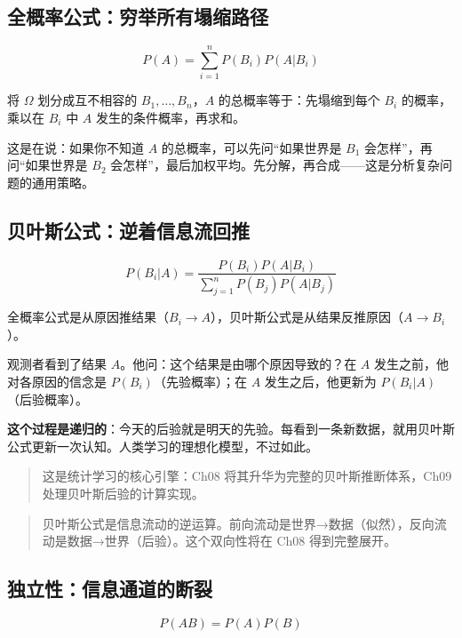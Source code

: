\documentclass[
]{book}
\begin{document}
\subsection{全概率公式：穷举所有塌缩路径}\label{ux5168ux6982ux7387ux516cux5f0fux7a77ux4e3eux6240ux6709ux584cux7f29ux8defux5f84}

\[P(A) = \sum_{i=1}^n P(B_i) P(A|B_i)\]

将 \(\Omega\) 划分成互不相容的 \(B_1, \ldots, B_n\)，\(A\) 的总概率等于：先塌缩到每个 \(B_i\) 的概率，乘以在 \(B_i\) 中 \(A\) 发生的条件概率，再求和。

这是在说：如果你不知道 \(A\) 的总概率，可以先问``如果世界是 \(B_1\) 会怎样''，再问``如果世界是 \(B_2\) 会怎样''，最后加权平均。先分解，再合成------这是分析复杂问题的通用策略。

\subsection{贝叶斯公式：逆着信息流回推}\label{ux8d1dux53f6ux65afux516cux5f0fux9006ux7740ux4fe1ux606fux6d41ux56deux63a8}

\[P(B_i|A) = \frac{P(B_i) P(A|B_i)}{\sum_{j=1}^n P(B_j) P(A|B_j)}\]

全概率公式是从原因推结果（\(B_i \to A\)），贝叶斯公式是从结果反推原因（\(A \to B_i\)）。

观测者看到了结果 \(A\)。他问：这个结果是由哪个原因导致的？在 \(A\) 发生之前，他对各原因的信念是 \(P(B_i)\)（先验概率）；在 \(A\) 发生之后，他更新为 \(P(B_i|A)\)（后验概率）。

\textbf{这个过程是递归的}：今天的后验就是明天的先验。每看到一条新数据，就用贝叶斯公式更新一次认知。人类学习的理想化模型，不过如此。

\begin{quote}
这是统计学习的核心引擎：Ch08 将其升华为完整的贝叶斯推断体系，Ch09 处理贝叶斯后验的计算实现。
\end{quote}

\begin{quote}
贝叶斯公式是信息流动的逆运算。前向流动是世界→数据（似然），反向流动是数据→世界（后验）。这个双向性将在 Ch08 得到完整展开。
\end{quote}

\subsection{独立性：信息通道的断裂}\label{ux72ecux7acbux6027ux4fe1ux606fux901aux9053ux7684ux65adux88c2}

\[P(AB) = P(A)P(B)\]
\end{document}
